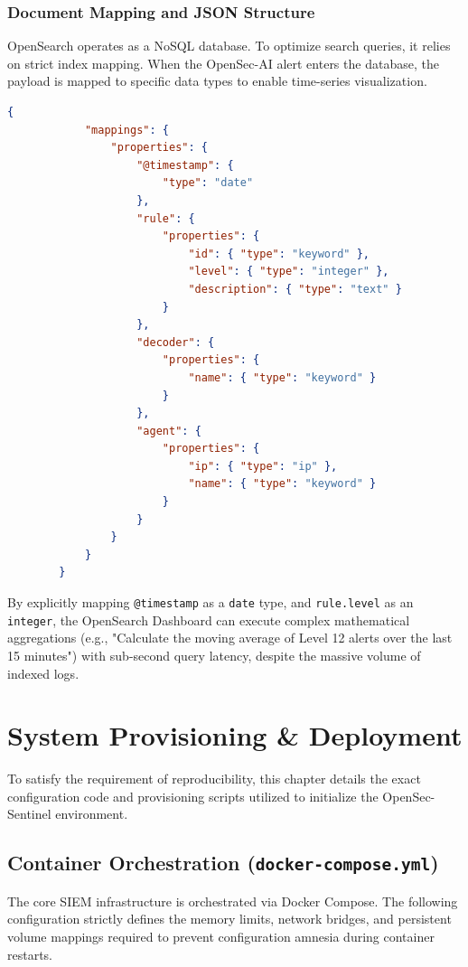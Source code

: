 \documentclass[12pt, a4paper]{report}
\begin{document}
	\subsection{Document Mapping and JSON Structure}
	OpenSearch operates as a NoSQL database. To optimize search queries, it relies on strict index mapping. When the OpenSec-AI alert enters the database, the payload is mapped to specific data types to enable time-series visualization.
	
	\begin{lstlisting}[language=json, caption=OpenSearch Index Mapping for OpenSec-AI Alerts]
		{
			"mappings": {
				"properties": {
					"@timestamp": {
						"type": "date"
					},
					"rule": {
						"properties": {
							"id": { "type": "keyword" },
							"level": { "type": "integer" },
							"description": { "type": "text" }
						}
					},
					"decoder": {
						"properties": {
							"name": { "type": "keyword" }
						}
					},
					"agent": {
						"properties": {
							"ip": { "type": "ip" },
							"name": { "type": "keyword" }
						}
					}
				}
			}
		}
	\end{lstlisting}
	
	By explicitly mapping \texttt{@timestamp} as a \texttt{date} type, and \texttt{rule.level} as an \texttt{integer}, the OpenSearch Dashboard can execute complex mathematical aggregations (e.g., "Calculate the moving average of Level 12 alerts over the last 15 minutes") with sub-second query latency, despite the massive volume of indexed logs.
	
	\chapter{System Provisioning \& Deployment}
	\onehalfspacing
	
	To satisfy the requirement of reproducibility, this chapter details the exact configuration code and provisioning scripts utilized to initialize the OpenSec-Sentinel environment.
	
	\section{Container Orchestration (\texttt{docker-compose.yml})}
	The core SIEM infrastructure is orchestrated via Docker Compose. The following configuration strictly defines the memory limits, network bridges, and persistent volume mappings required to prevent configuration amnesia during container restarts.
	
\end{document}
